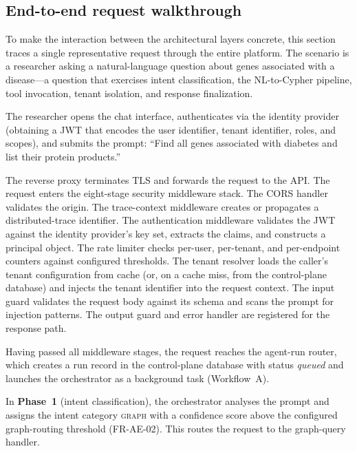 \documentclass[a4paper]{sapthesis}
\begin{document}
\subsection{End-to-end request walkthrough}
\label{sec:request-walkthrough}

To make the interaction between the architectural layers concrete, this
section traces a single representative request through the entire platform.
The scenario is a researcher asking a natural-language question about genes
associated with a disease---a question that exercises intent
classification, the NL-to-Cypher pipeline, tool invocation, tenant
isolation, and response finalization.

The researcher opens the chat interface, authenticates via the identity
provider (obtaining a JWT that encodes the user identifier, tenant
identifier, roles, and scopes), and submits the prompt: ``Find all genes
associated with diabetes and list their protein products.''

The reverse proxy terminates TLS and forwards the request to the API.
The request enters the eight-stage security middleware stack.  The CORS
handler validates the origin.  The trace-context middleware creates or
propagates a distributed-trace identifier.  The authentication middleware
validates the JWT against the identity provider's key set, extracts the
claims, and constructs a principal object.  The rate limiter checks
per-user, per-tenant, and per-endpoint counters against configured
thresholds.  The tenant resolver loads the caller's tenant configuration
from cache (or, on a cache miss, from the control-plane database) and
injects the tenant identifier into the request context.  The input guard
validates the request body against its schema and scans the prompt for
injection patterns.  The output guard and error handler are registered for
the response path.

Having passed all middleware stages, the request reaches the agent-run
router, which creates a run record in the control-plane database with
status \emph{queued} and launches the orchestrator as a background task
(Workflow~A).

In \textbf{Phase~1} (intent classification), the orchestrator analyses the
prompt and assigns the intent category \textsc{graph} with a confidence
score above the configured graph-routing threshold (FR-AE-02).  This routes
the request to the graph-query handler.
\end{document}
